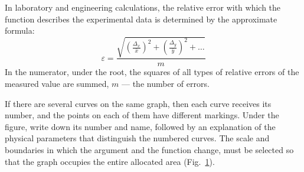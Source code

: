 \documentclass{LabWorkEng}
\begin{document}
In laboratory and engineering calculations, the relative error with which the function describes the experimental data is determined by the approximate formula: 
\begin{equation}\label{eps}
	\varepsilon  = \frac{{\sqrt {{{\left( {\frac{{{\Delta _x}}}{{\bar x}}} \right)}^2} + {{\left( {\frac{{{\Delta _y}}}{{\bar y}}} \right)}^2} + \ldots} }}{m}
\end{equation}
In the numerator, under the root, the squares of all types of relative errors of the measured value are summed, $m$ --- the number of errors. 

If there are several curves on the same graph, then each curve receives its number, and the points on each of them have different markings. Under the figure, write down its number and name, followed by an explanation of the physical parameters that distinguish the numbered curves. The scale and boundaries in which the argument and the function change, must be selected so that the graph occupies the entire allocated area (Fig.~\ref{fig2}).

\begin{figure}[!htbp]\centering
	\figcaption{}
	\label{fig2}
\end{figure}
\end{document}
